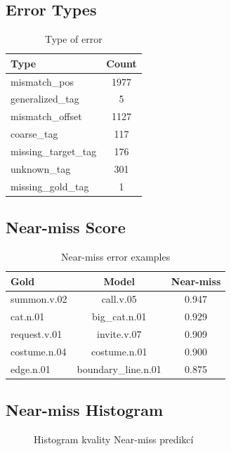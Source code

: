 \documentclass[12pt,a4paper]{article}
\begin{document}
\subsection*{Error Types}
\begin{table}[H]
\centering
\caption{Type of error}
\begin{tabular}{lc}
\toprule
Type & Count\\
\midrule
mismatch\_pos & 1977\\
generalized\_tag & 5\\
mismatch\_offset & 1127\\
coarse\_tag & 117\\
missing\_target\_tag & 176\\
unknown\_tag & 301\\
missing\_gold\_tag & 1\\
\bottomrule
\end{tabular}
\end{table}


\subsection*{Near-miss Score}
\begin{table}[H]
\centering
\caption{Near-miss error examples}
\begin{tabular}{lcc}
\toprule
Gold & Model & Near-miss\\
\midrule
summon.v.02 & call.v.05 & 0.947\\
cat.n.01 & big\_cat.n.01 & 0.929\\
request.v.01 & invite.v.07 & 0.909\\
costume.n.04 & costume.n.01 & 0.900\\
edge.n.01 & boundary\_line.n.01 & 0.875\\
\bottomrule
\end{tabular}
\end{table}

\subsection*{Near-miss Histogram}
\begin{figure}[H]
\centering
{}
\caption{Histogram kvality Near-miss predikcí}
\end{figure}
\end{document}
